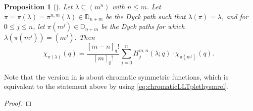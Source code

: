 \documentclass[12pt,reqno]{amsart}
\theoremstyle{plain}
\newtheorem{proposition}[theorem]{Proposition}
\theoremstyle{definition}
\theoremstyle{remark}
\theoremstyle{example}
\numberwithin{equation}{section}
\newcommand{\DD}{\mathbb{D}}
\begin{document}
\begin{proposition}[]
	Let $\lambda \subseteq (m^n)$ with $n \leq m$. Let $\pi = \pi(\lambda) = \pi^{n,m}(\lambda) \in \DD_{n+m}$ be the Dyck path such that $\lambda(\pi) = \lambda$, and for $0 \leq j \leq n$, let $\pi(m^j) \in \DD_{n+m}$ be the Dyck paths for which $\lambda(\pi(m^j)) = (m^j)$. Then $$ \chi_{\pi(\lambda)}(q) = \dfrac{[m-n]_q!}{[m]_q!} \sum_{j=0}^{n} H^{m,n}_j(\lambda;q) \cdot \chi_{\pi(m^j)}(q).$$
\end{proposition}

Note that the version in \cite{CMP_rook} is about chromatic symmetric functions, which is equivalent to the statement above by using \eqref{eq:chromaticLLTplethysmrel}.



\begin{proof}
	

\end{proof}
\end{document}
